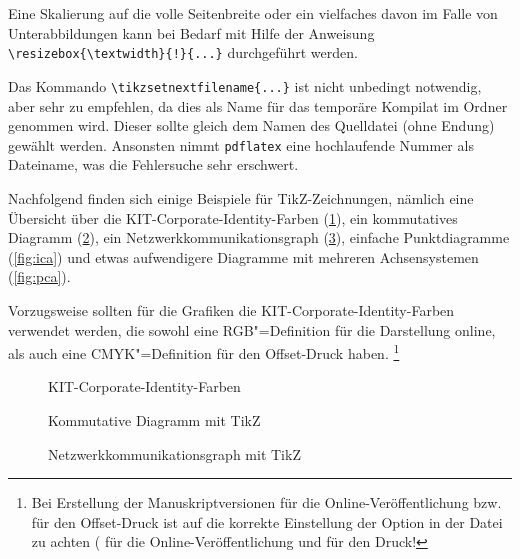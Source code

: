 Eine Skalierung auf die volle Seitenbreite oder ein vielfaches davon im Falle von Unterabbildungen kann bei Bedarf mit Hilfe der Anweisung
\lstinline|\resizebox{\textwidth}{!}{...}|
durchgeführt werden.

Das Kommando \lstinline|\tikzsetnextfilename{...}| ist nicht unbedingt notwendig,
 aber sehr zu empfehlen, da dies als Name für das temporäre Kompilat im Ordner
 genommen wird.
Dieser sollte gleich dem Namen des Quelldatei (ohne Endung) gewählt werden.
Ansonsten nimmt \texttt{pdflatex} eine hochlaufende Nummer als Dateiname,
was die Fehlersuche sehr erschwert.

Nachfolgend finden sich einige Beispiele für TikZ-Zeichnungen, nämlich
eine Übersicht über die KIT-Corporate-Identity-Farben (\cref{fig:kit-colors}),
ein kommutatives Diagramm (\cref{fig:kpca}),
ein Netzwerkkommunikationsgraph (\cref{fig:net-comm}),
einfache Punktdiagramme (\cref{fig:ica})
und etwas aufwendigere Diagramme mit mehreren
Achsensystemen (\cref{fig:pca}).

Vorzugsweise sollten für die Grafiken die KIT-Corporate-Identity-Farben verwendet werden,
die sowohl eine RGB"=Definition für die Darstellung online,
als auch eine CMYK"=Definition für den Offset-Druck haben.%
\footnote{Bei Erstellung der Manuskriptversionen
für die Online-Veröffentlichung bzw. für den Offset-Druck
ist auf die korrekte Einstellung der Option 
in der Datei  zu achten
( für die Online-Veröffentlichung und  für den Druck!}

\begin{figure}[hp]%
	\centering%
	\caption{KIT-Corporate-Identity-Farben}%
  \label{fig:kit-colors}%
\end{figure}

\begin{figure}[hp]%
	\centering%
	\caption{Kommutative Diagramm mit TikZ}%
  \label{fig:kpca}%
\end{figure}

\begin{figure}[hp]%
	\centering
	\resizebox{\textwidth}{!}{%
	}%
	\caption{Netzwerkkommunikationsgraph mit TikZ}%
  \label{fig:net-comm}%
\end{figure}

